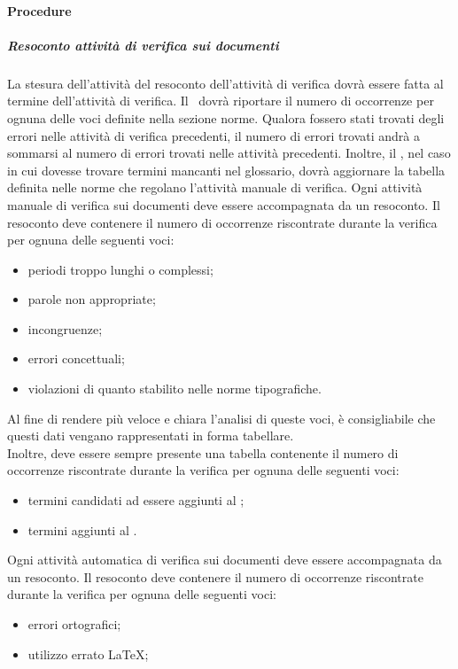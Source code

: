 \documentclass[../NormeProgetto.tex]{subfiles}
\begin{document}
		\paragraph{Procedure}
		\subparagraph{Resoconto attività di verifica sui documenti}	
				La stesura dell'attività del resoconto dell'attività di verifica dovrà essere fatta al termine dell'attività di verifica. Il \verificatore\ dovrà riportare il numero di occorrenze per ognuna delle voci definite nella sezione norme. Qualora fossero stati trovati degli errori nelle attività di verifica precedenti, il numero di errori trovati andrà a sommarsi al numero di errori trovati nelle attività precedenti.
				Inoltre, il \verificatore, nel caso in cui dovesse trovare termini mancanti nel glossario, dovrà aggiornare la tabella definita nelle norme che regolano l'attività manuale di verifica.
			Ogni attività manuale di verifica sui documenti deve essere accompagnata da un resoconto. Il resoconto deve contenere il numero di occorrenze riscontrate durante la verifica per ognuna delle seguenti voci:
			\begin{itemize}
				\item periodi troppo lunghi o complessi;
				\item parole non appropriate;
				\item incongruenze;
				\item errori concettuali;
				\item violazioni di quanto stabilito nelle norme tipografiche.		
			\end{itemize}
			Al fine di rendere più veloce e chiara l'analisi di queste voci, è consigliabile che questi dati vengano rappresentati in forma tabellare.\\
			Inoltre, deve essere sempre presente una tabella contenente il numero di occorrenze riscontrate durante la verifica per ognuna delle seguenti voci:
				\begin{itemize}
					\item termini candidati ad essere aggiunti al \glossario;
					\item termini aggiunti al \glossario.
				\end{itemize}
				Ogni attività automatica di verifica sui documenti deve essere accompagnata da un resoconto. Il resoconto deve contenere il numero di occorrenze riscontrate durante la verifica per ognuna delle seguenti voci:
				\begin{itemize}
				\item errori ortografici;
				\item utilizzo errato \LaTeX\g;	
				\end{itemize}
			
\end{document}
